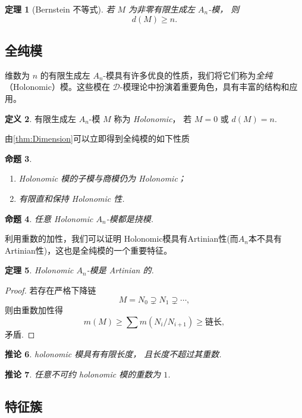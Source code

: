 \documentclass[11pt]{article}
\theoremstyle{plain}
\newtheorem{theorem}{定理}[section]
\newtheorem{proposition}[theorem]{命题}
\newtheorem{corollary}[theorem]{推论}
\theoremstyle{definition}
\newtheorem{definition}[theorem]{定义}
\theoremstyle{remark}
\begin{document}
\begin{theorem}[Bernstein 不等式]
    若 $M$ 为非零有限生成左 $A_n$-模，
    则
    \[
        d(M)\ge n.
    \]
\end{theorem}


\subsection{全纯模}
维数为 $n$ 的有限生成左 $A_n$-模具有许多优良的性质，我们将它们称为\emph{全纯}（Holonomic）模。这些模在 $\mathcal{D}$-模理论中扮演着重要角色，具有丰富的结构和应用。
\begin{definition}
    有限生成左 $A_n$-模 $M$
    称为 \emph{Holonomic}，
    若 $M=0$ 或 $d(M)=n$.
\end{definition}
由\ref{thm:Dimension}可以立即得到全纯模的如下性质
\begin{proposition}
    \begin{enumerate}
        \item
              Holonomic 模的子模与商模仍为 Holonomic；
        \item
              有限直和保持 Holonomic 性.
    \end{enumerate}
\end{proposition}

\begin{proposition}
    任意 Holonomic $A_n$-模都是挠模.
\end{proposition}


利用重数的加性，我们可以证明 Holonomic模具有Artinian性(而$A_n$本不具有Artinian性)，这也是全纯模的一个重要特征。
\begin{theorem}
    Holonomic $A_n$-模是 Artinian 的.
\end{theorem}

\begin{proof}
    若存在严格下降链
    \[
        M=N_0\supsetneq N_1\supsetneq\cdots,
    \]
    则由重数加性得
    \[
        m(M)\ge\sum m(N_i/N_{i+1})\ge\text{链长},
    \]
    矛盾.
\end{proof}

\begin{corollary}
    holonomic 模具有有限长度，
    且长度不超过其重数.
\end{corollary}

\begin{corollary}
    任意不可约 holonomic 模的重数为 $1$.
\end{corollary}


\subsection{特征簇}
\end{document}
